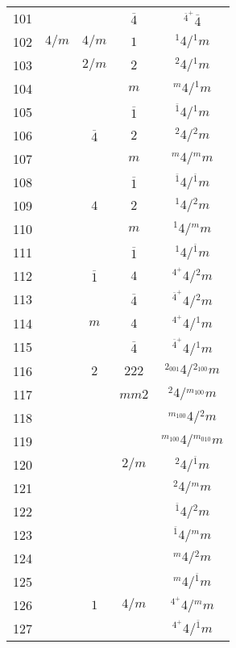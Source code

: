 \begin{longtable}{ccccc}
  101 &  &  & $\overline{4}$ & ${}^{\overline{4}^{+}} \overline{4} $\\
  102 & $4/m$ & $4/m$ & $1$ & ${}^{1} 4  / {}^{1} m $\\
  103 &  & $2/m$ & $2$ & ${}^{2} 4  / {}^{1} m $\\
  104 &  &  & $m$ & ${}^{m} 4  / {}^{1} m $\\
  105 &  &  & $\overline{1}$ & ${}^{\overline{1}} 4  / {}^{1} m $\\
  106 &  & $\overline{4}$ & $2$ & ${}^{2} 4  / {}^{2} m $\\
  107 &  &  & $m$ & ${}^{m} 4  / {}^{m} m $\\
  108 &  &  & $\overline{1}$ & ${}^{\overline{1}} 4  / {}^{\overline{1}} m $\\
  109 &  & $4$ & $2$ & ${}^{1} 4  / {}^{2} m $\\
  110 &  &  & $m$ & ${}^{1} 4  / {}^{m} m $\\
  111 &  &  & $\overline{1}$ & ${}^{1} 4  / {}^{\overline{1}} m $\\
  112 &  & $\overline{1}$ & $4$ & ${}^{4^{+}} 4  / {}^{2} m $\\
  113 &  &  & $\overline{4}$ & ${}^{\overline{4}^{+}} 4  / {}^{2} m $\\
  114 &  & $m$ & $4$ & ${}^{4^{+}} 4  / {}^{1} m $\\
  115 &  &  & $\overline{4}$ & ${}^{\overline{4}^{+}} 4  / {}^{1} m $\\
  116 &  & $2$ & $222$ & ${}^{2_{001}} 4  / {}^{2_{100}} m $\\
  117 &  &  & $mm2$ & ${}^{2} 4  / {}^{m_{100}} m $\\
  118 &  &  &  & ${}^{m_{100}} 4  / {}^{2} m $\\
  119 &  &  &  & ${}^{m_{100}} 4  / {}^{m_{010}} m $\\
  120 &  &  & $2/m$ & ${}^{2} 4  / {}^{\overline{1}} m $\\
  121 &  &  &  & ${}^{2} 4  / {}^{m} m $\\
  122 &  &  &  & ${}^{\overline{1}} 4  / {}^{2} m $\\
  123 &  &  &  & ${}^{\overline{1}} 4  / {}^{m} m $\\
  124 &  &  &  & ${}^{m} 4  / {}^{2} m $\\
  125 &  &  &  & ${}^{m} 4  / {}^{\overline{1}} m $\\
  126 &  & $1$ & $4/m$ & ${}^{4^{+}} 4  / {}^{m} m $\\
  127 &  &  &  & ${}^{4^{+}} 4  / {}^{\overline{1}} m $\\

\end{longtable}
